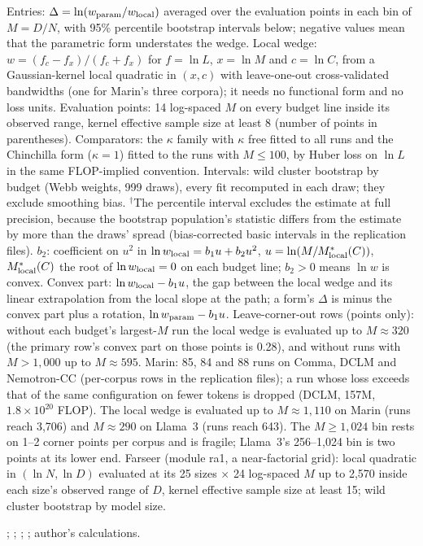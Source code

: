 \begin{table}[tp]
\begin{tablenotes}
Entries: $\Delta=\ln(w_{\rm param}/w_{\rm local})$ averaged over the evaluation points in each bin of $M=D/N$, with 95\% percentile bootstrap intervals below; negative values mean that the parametric form understates the wedge. Local wedge: $w=(f_c-f_x)/(f_c+f_x)$ for $f=\ln L$, $x=\ln M$ and $c=\ln C$, from a Gaussian-kernel local quadratic in $(x,c)$ with leave-one-out cross-validated bandwidths (one for Marin's three corpora); it needs no functional form and no loss units. Evaluation points: 14 log-spaced $M$ on every budget line inside its observed range, kernel effective sample size at least 8 (number of points in parentheses). Comparators: the $\kappa$ family with $\kappa$ free fitted to all runs and the Chinchilla form ($\kappa=1$) fitted to the runs with $M\le100$, by Huber loss on $\ln L$ in the same FLOP-implied convention. Intervals: wild cluster bootstrap by budget (Webb weights, 999 draws), every fit recomputed in each draw; they exclude smoothing bias. $^{\dagger}$The percentile interval excludes the estimate at full precision, because the bootstrap population's statistic differs from the estimate by more than the draws' spread (bias-corrected basic intervals in the replication files). $b_2$: coefficient on $u^2$ in $\ln w_{\rm local}=b_1u+b_2u^2$, $u=\ln(M/M^*_{\rm local}(C))$, $M^*_{\rm local}(C)$ the root of $\ln w_{\rm local}=0$ on each budget line; $b_2>0$ means $\ln w$ is convex. Convex part: $\ln w_{\rm local}-b_1u$, the gap between the local wedge and its linear extrapolation from the local slope at the path; a form's $\Delta$ is minus the convex part plus a rotation, $\ln w_{\rm param}-b_1u$. Leave-corner-out rows (points only): without each budget's largest-$M$ run the local wedge is evaluated up to $M\approx320$ (the primary row's convex part on those points is 0.28), and without runs with $M>1{,}000$ up to $M\approx595$. Marin: 85, 84 and 88 runs on Comma, DCLM and Nemotron-CC (per-corpus rows in the replication files); a run whose loss exceeds that of the same configuration on fewer tokens is dropped (DCLM, 157M, $1.8\times10^{20}$ FLOP). The local wedge is evaluated up to $M\approx1{,}110$ on Marin (runs reach 3,706) and $M\approx290$ on Llama~3 (runs reach 643). The $M\ge1{,}024$ bin rests on 1--2 corner points per corpus and is fragile; Llama~3's 256--1,024 bin is two points at its lower end. Farseer (module ra1, a near-factorial grid): local quadratic in $(\ln N,\ln D)$ evaluated at its 25 sizes $\times$ 24 log-spaced $M$ up to 2,570 inside each size's observed range of $D$, kernel effective sample size at least 15; wild cluster bootstrap by model size.
\end{tablenotes}

\begin{tablenotes}[Source]
\citet{li2025predictableb}; \citet{marin2026ladders}; \citet{grattafiori2024llama}; \citet{czech2026llama3isoflop}; author's calculations.
\end{tablenotes}
\end{table}
